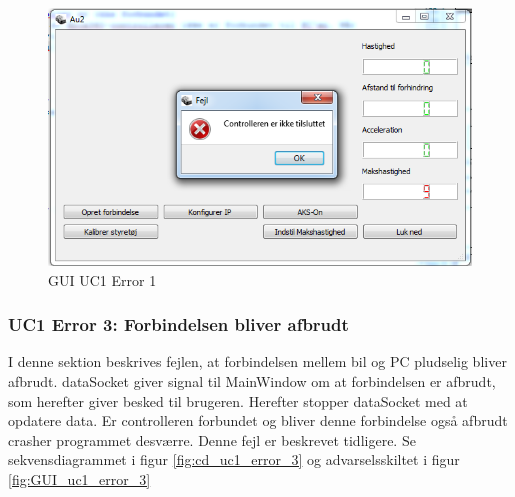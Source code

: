 \begin{figure}[H]
\centering
\includegraphics[width=\textwidth* 3/4,height=\textwidth* 9/20 ]{../fig/billeder/gui_uc1_error_2.png}
\caption{GUI UC1 Error 1}
\label{fig:GUI_uc1_error_2}
\end{figure}

\subsubsection{UC1 Error 3: Forbindelsen bliver afbrudt}
I denne sektion beskrives fejlen, at forbindelsen mellem bil og PC pludselig bliver afbrudt. dataSocket giver signal til MainWindow om at forbindelsen er afbrudt, som herefter giver besked til brugeren. Herefter stopper dataSocket med at opdatere data. Er controlleren forbundet og bliver denne forbindelse også afbrudt crasher programmet desværre. Denne fejl er beskrevet tidligere. Se sekvensdiagrammet i figur \ref{fig:cd_uc1_error_3} og advarselsskiltet i figur \ref{fig:GUI_uc1_error_3} 

